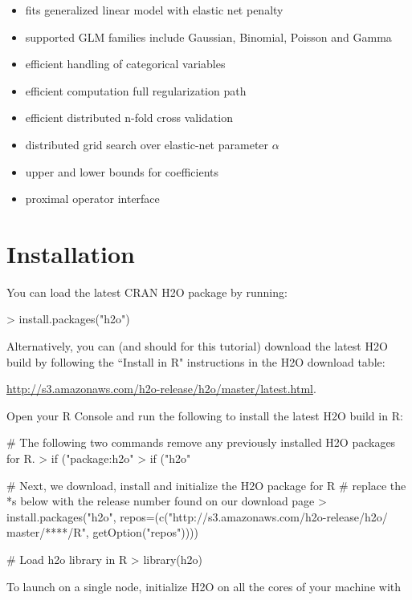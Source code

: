 \documentclass[11pt]{article}
\begin{document}
\begin{itemize} 
\item fits generalized linear model with elastic net penalty
\item supported GLM families include Gaussian, Binomial, Poisson and Gamma
\item efficient handling of categorical variables
\item efficient computation full regularization path
\item efficient distributed n-fold cross validation
\item distributed grid search over elastic-net parameter $\alpha$
\item upper and lower bounds for coefficients
\item proximal operator interface
\end{itemize}



\section{Installation} 

You can load the latest CRAN H2O package by running:

\begin{spverbatim}
> install.packages("h2o")
\end{spverbatim}
\bigskip
\noindent
Alternatively, you can (and should for this tutorial) download the latest H2O build by following the ``Install in R" instructions in the H2O download table:

\indent \indent \indent \url{http://s3.amazonaws.com/h2o-release/h2o/master/latest.html}.

\noindent
Open your R Console and run the following to install the latest H2O build in R:

\begin{spverbatim}
# The following two commands remove any previously installed H2O packages for R.
> if ("package:h2o" %
> if ("h2o" %

# Next, we download, install and initialize the H2O package for R
# replace the *s below with the release number found on our download page
> install.packages("h2o", repos=(c("http://s3.amazonaws.com/h2o-release/h2o/
master/****/R", getOption("repos"))))

# Load h2o library in R
> library(h2o)

\end{spverbatim}
\noindent
To launch on a single node, initialize H2O on all the cores of your machine with
\end{document}
